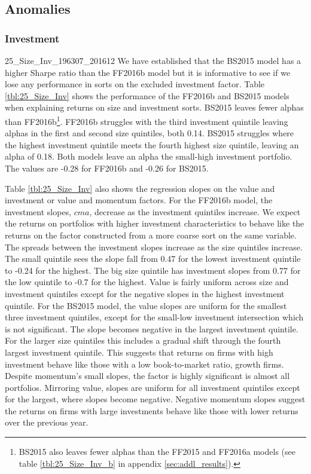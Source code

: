 
\subsection{Anomalies}

\subsubsection{Investment}

{25_Size_Inv_196307_201612}
We have established that the BS2015 model has a higher Sharpe ratio than the FF2016b model
but  it is informative to see if we lose any performance in sorts on the excluded
investment factor. Table \ref{tbl:25_Size_Inv} shows the performance of the FF2016b and
BS2015 models when  explaining returns on size and investment sorts. BS2015 leaves fewer
alphas than FF2016b\footnote{BS2015 also leaves fewer alphas than the  FF2015 and FF2016a
models (see table \ref{tbl:25_Size_Inv_b} in appendix  \ref{sec:addl_results}).}. FF2016b
struggles with the third investment quintile leaving alphas in the first and second  size
quintiles, both 0.14. BS2015 struggles where the highest investment quintile meets the
fourth highest size quintile,  leaving an alpha of 0.18. Both models leave an alpha the
small-high investment portfolio. The values are -0.28 for FF2016b and -0.26 for BS2015.

Table \ref{tbl:25_Size_Inv} also shows the regression slopes on the value and investment
or  value and momentum factors. For the FF2016b model, the investment slopes, $cma$,
decrease as the investment quintiles  increase. We expect the returns on portfolios with
higher investment characteristics to behave like the  returns on the factor constructed
from a more coarse sort on the same variable. The spreads between the investment slopes
increase as the size quintiles increase. The small quintile sees the slope fall from 0.47
for the lowest investment quintile to -0.24  for the highest. The big size quintile has
investment slopes from 0.77 for the low quintile to -0.7 for the  highest. Value is fairly
uniform across size and investment quintiles except for the negative slopes in  the
highest investment quintile. For the BS2015 model, the value slopes are uniform for the
smallest three investment  quintiles, except for the small-low investment intersection
which is not significant. The slope becomes negative in the largest investment quintile.
For the larger size quintiles this includes a gradual shift through the fourth largest
investment quintile. This suggests that returns on firms with high investment behave like
those with a low  book-to-market ratio, growth firms. Despite momentum's small slopes, the
factor is highly significant is almost all portfolios. Mirroring value, slopes are uniform
for all investment quintiles except for the largest, where  slopes become negative.
Negative momentum slopes suggest the returns on firms with large investments behave like
those  with lower returns over the previous year.

